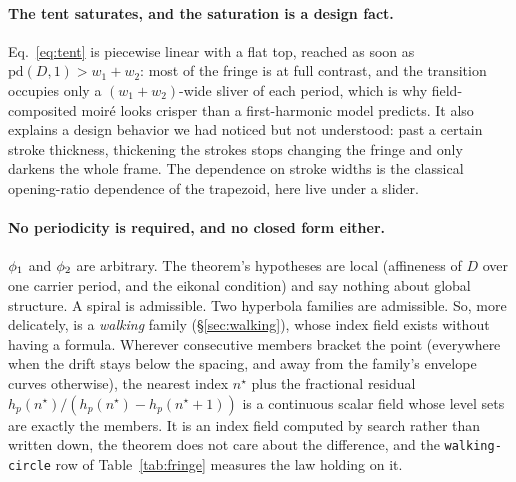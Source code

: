 \paragraph{The tent saturates, and the saturation is a design fact.}
Eq.~\ref{eq:tent} is piecewise linear with a flat top, reached as soon as
$\mathrm{pd}(D,1)>w_1+w_2$: most of the fringe is at full contrast, and the
transition occupies only a $(w_1{+}w_2)$-wide sliver of each period, which is
why field-composited moir\'e looks crisper than a first-harmonic model
predicts. It also explains a design behavior we had noticed but not
understood: past a certain stroke thickness, thickening the strokes stops changing the
fringe and only darkens the whole frame. The dependence on stroke widths is the
classical opening-ratio dependence of the trapezoid, here live under a slider.

\paragraph{No periodicity is required, and no closed form either.}
$\phi_1$ and $\phi_2$ are arbitrary. The theorem's hypotheses are local
(affineness of $D$ over one carrier period, and the eikonal condition) and say
nothing about global structure. A spiral is admissible. Two hyperbola families are
admissible. So, more delicately, is a \emph{walking} family
(\S\ref{sec:walking}), whose index field exists without having a formula.
Wherever consecutive members bracket the point (everywhere when the drift
stays below the spacing, and away from the family's envelope curves
otherwise), the nearest index $n^\star$ plus the fractional residual
$h_p(n^\star)/(h_p(n^\star)-h_p(n^\star{+}1))$ is a continuous scalar field whose
level sets are exactly the members. It is an index field computed by search
rather than written down, the theorem does not care about the difference, and
the \texttt{walking-circle} row of Table~\ref{tab:fringe} measures the law
holding on it.

